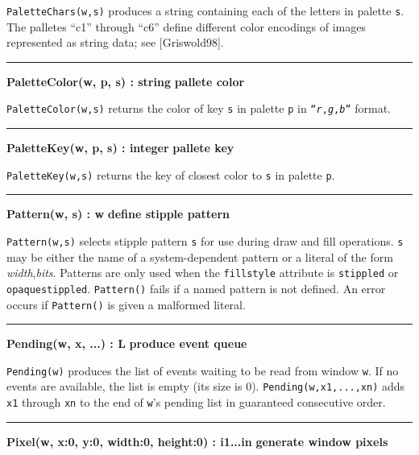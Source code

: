 \noindent
\texttt{PaletteChars(w,s)} produces a string containing each of the
letters in palette \texttt{s}. The palletes
{\textquotedblleft}c1{\textquotedblright} through
{\textquotedblleft}c6{\textquotedblright} define different color
encodings of images represented as string data; see [Griswold98].

\bigskip\hrule\vspace{0.1cm}
\noindent
{\bf PaletteColor(w, p, s) : string } \hfill {\bf pallete color}

\noindent
\texttt{PaletteColor(w,s)} returns the color of key \texttt{s} in
palette \texttt{p} in
\texttt{{\textquotedblleft}}\texttt{\textit{r}}\texttt{,}\texttt{\textit{g}}\texttt{,}\texttt{\textit{b}}\texttt{{\textquotedblright}}
format.

\bigskip\hrule\vspace{0.1cm}
\noindent
{\bf PaletteKey(w, p, s) : integer } \hfill {\bf pallete key}

\noindent
\texttt{PaletteKey(w,s)} returns the key of closest color to \texttt{s}
in palette \texttt{p}.

\bigskip\hrule\vspace{0.1cm}
\noindent
{\bf Pattern(w, s) : w } \hfill {\bf define stipple pattern}

\noindent
\texttt{Pattern(w,s)} selects stipple pattern \texttt{s} for use during
draw and fill operations. \texttt{s} may be either the name of a
system-dependent pattern or a literal of the form
\textit{width},\textit{bits}. Patterns are only used when the
\texttt{fillstyle} attribute is \texttt{stippled} or
\texttt{opaquestippled}. \texttt{Pattern()} fails if a named pattern
is not defined. An error occurs if \texttt{Pattern()} is given a
malformed literal.

\bigskip\hrule\vspace{0.1cm}
\noindent
{\bf Pending(w, x, ...) : L } \hfill {\bf produce event queue}

\noindent
\texttt{Pending(w)} produces the list of events waiting to be read from
window \texttt{w}. If no events are available, the list is empty (its
size is 0). \texttt{Pending(w,x1,...,xn)} adds \texttt{x1} through
\texttt{xn} to the end of \texttt{w}'s pending list in
guaranteed consecutive order.

\bigskip\hrule\vspace{0.1cm}
\noindent
{\bf Pixel(w, x:0, y:0, width:0, height:0) : i1...in } \hfill {\bf generate window pixels}

